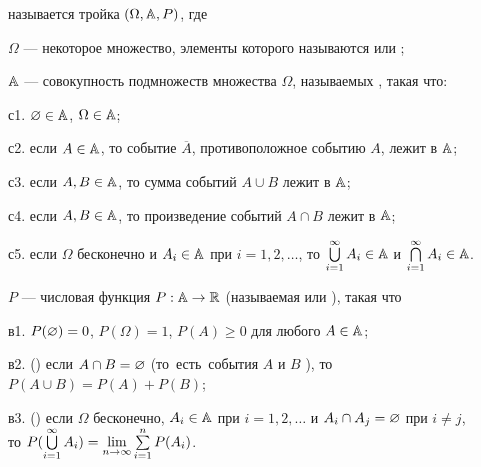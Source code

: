 \documentclass[a4paper,11pt]{article}
\begin{document}
{\small
{}  называется тройка $(\Omega ,\mathbb{A}, P)$, где
\begin{items}{-5}
\item[$\Omega $] --- некоторое множество, элементы которого называются  или ;
\item[$\mathbb{A}$] --- совокупность подмножеств множества $\Omega$, называемых , такая что:
\begin{nums}{-4}
\item[с1.] $\varnothing \in \mathbb{A}$, $\Omega \in \mathbb{A}$;
\item[с2.] если $A \in \mathbb{A}$, то событие $\overline {A}$,  противоположное событию $A$,
лежит в $\mathbb{A}$;
\item[с3.] если $A,B \in \mathbb{A}$, то  сумма событий $A\cup B$
лежит в $\mathbb{A}$;
\item[с4.] если $A,B \in \mathbb{A}$, то  произведение событий $A\cap B$
лежит в $\mathbb{A}$;
\item[с5.]  если $\Omega$ бесконечно и $A_i \in \mathbb{A}$ при $i=1,2,\dots $, то
    $\bigcup\limits_{i=1}^{\infty} A_i \in \mathbb{A} $  и
    $\bigcap\limits_{i=1}^{\infty} A_i \in \mathbb{A} $.
\end{nums}
\item[$P$] --- числовая функция $P:\mathbb{A}\rightarrow {\Bbb R}$ (называемая  или ), такая что
\begin{nums}{-4}
\item[в1.] $P(\varnothing)=0$, $P(\Omega)=1$, $P(A)\ge 0$ для любого $A \in \mathbb{A}$;
\item[в2.] () %
если $A\cap B=\varnothing$ (то~есть~события $A$ и $B$ ), то $P(A\cup B)=P(A)+P(B)$;
\item[в3.] ()
если $\Omega$ бесконечно, $A_i \in \mathbb{A}$ при $i=1,2,\dots $ и $A_i\cap A_j=\varnothing$ при $i\ne j$,\\ то
$P(\bigcup\limits_{i=1}^{\infty}A_i)=
\lim\limits_{n\rightarrow\infty}\sum\limits_{i=1}^{n}P(A_i)$.
\end{nums}
\end{items}
}
\end{document}

